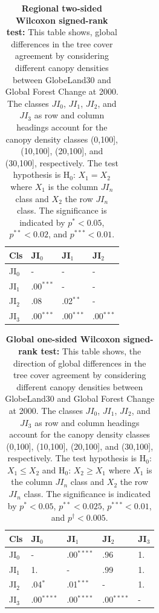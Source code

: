 			\begin{table}[ht]
				\centering
				\caption[Global two-sided Wilcoxon signed-rank test]{\textbf{Regional two-sided Wilcoxon signed-rank test:} This table shows, global differences in the tree cover agreement by considering different canopy densities between GlobeLand30 and Global Forest Change at 2000. The classes $JI_0$, $JI_1$, $JI_2$, and $JI_3$ as row and column headings account for the canopy density classes (0,100], (10,100], (20,100], and (30,100], respectively. The test hypothesis is H$_0$: $X_1=X_2$ where $X_1$ is the column $JI_n$ class and $X_2$ the row $JI_n$ class. The significance is indicated by $p^{*}<0.05$, $p^{**}<0.02$, and $p^{***}<0.01$.}
				\label{tab:wilcoxontwosided_all}
				\begin{tabular}{llll}
					\hline
					Cls & JI$_0$ & JI$_1$ & JI$_2$ \\\hline
					JI$_0$ & - & - & - \\
					JI$_1$ & .00$^{***}$ & - & - \\
					JI$_2$ & .08 & .02$^{**}$ & - \\
					JI$_3$ & .00$^{***}$ & .00$^{***}$ & .00$^{***}$ \\\hline
				\end{tabular}
			\end{table}
			\begin{table}[ht]
				\centering
				\caption[Global one-sided Wilcoxon signed-rank test]{\textbf{Global one-sided Wilcoxon signed-rank test:} This table shows, the direction of global differences in the tree cover agreement by considering different canopy densities between GlobeLand30 and Global Forest Change at 2000. The classes $JI_0$, $JI_1$, $JI_2$, and $JI_3$ as row and column headings account for the canopy density classes (0,100], (10,100], (20,100], and (30,100], respectively. The test hypothesis is H$_0$: $X_1\leq X_2$ and H$_0$: $X_2\geq X_1$ where $X_1$ is the column $JI_n$ class and $X_2$ the row $JI_n$ class. The significance is indicated by $p^{*}<0.05$, $p^{**}<0.025$, $p^{***}<0.01$, and $p^{\dagger}<0.005$.}
				\label{tab:wilcoxononesided_all}
				\begin{tabular}{lllll}
					\hline
					Cls & JI$_0$ & JI$_1$ & JI$_2$ & JI$_3$ \\\hline
					JI$_0$ & - & .00$^{****}$ & .96 & 1. \\
					JI$_1$ & 1. & - & .99 & 1. \\
					JI$_2$ & .04$^{*}$ & .01$^{***}$ & - & 1. \\
					JI$_3$ & .00$^{****}$ & .00$^{****}$ & .00$^{****}$ & - \\\hline
				\end{tabular}
			\end{table}

